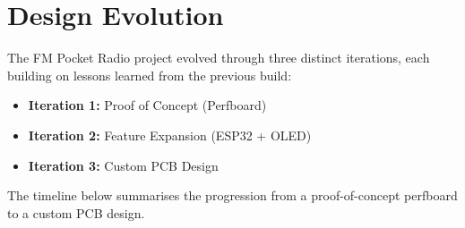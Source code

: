 
\section{Design Evolution}

The FM Pocket Radio project evolved through three distinct iterations, each
building on lessons learned from the previous build:
\begin{itemize}[leftmargin=1.8em, itemsep=2pt]
  \item \textbf{Iteration 1:} Proof of Concept (Perfboard)
  \item \textbf{Iteration 2:} Feature Expansion (ESP32 + OLED)
  \item \textbf{Iteration 3:} Custom PCB Design
\end{itemize}
The timeline below summarises the progression from a proof-of-concept perfboard to a custom PCB design.

